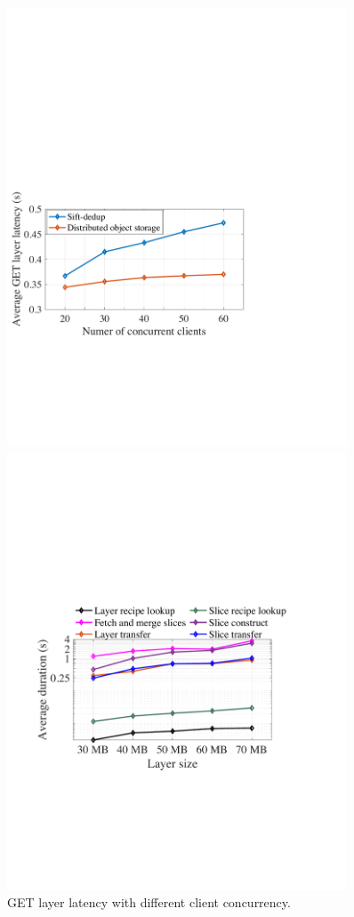 \begin{figure}[t]
\begin{minipage}{0.3\textwidth}
		\includegraphics[width=0.9\textwidth]{graphs/clientscale.pdf}
		\caption{GET layer latency with different client concurrency.}
		\label{fig:eval-clientscale}
	\end{minipage}%
	\hspace{1mm}
	\begin{minipage}{0.3\textwidth}
	\centering
	\includegraphics[width=0.9\textwidth]{graphs/restoringbreakdown.pdf}

\end{minipage}
\end{figure}
